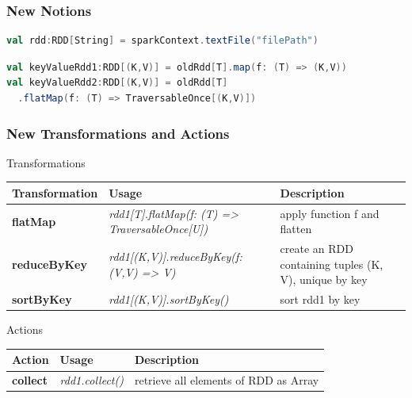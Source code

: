 \documentclass[slidetop,9pt,utf8]{beamer}
\begin{document}
\begin{frame}[fragile]
  \frametitle{New Notions}

  \begin{lstlisting}[label=LoadTextFile, caption=Load Text File, language=scala, style=code]
val rdd:RDD[String] = sparkContext.textFile("filePath")
  \end{lstlisting}

  \begin{lstlisting}[label=TransformToKeyValue, caption=Transform RDD to a Key/Value RDD (Also called PairRDD), language=scala, style=code]
val keyValueRdd1:RDD[(K,V)] = oldRdd[T].map(f: (T) => (K,V))
val keyValueRdd2:RDD[(K,V)] = oldRdd[T]
  .flatMap(f: (T) => TraversableOnce[(K,V)])
  \end{lstlisting}

\end{frame}

\begin{frame}

  \frametitle{New Transformations and Actions}

  \begin{block}{Transformations}
    \begin{center}
      \begin{tabular}{|m{2.0cm}|m{4.0cm}|m{4.9cm}|}
        \hline 
        \rowcolor{gray} \textbf{Transformation} & \textbf{Usage} & \textbf{Description} \\ \hline
        \textbf{flatMap} & \textit{rdd1[T].flatMap(f: (T) =\textgreater\xspace TraversableOnce[U])} & apply function f and flatten \\ \hline
        \textbf{reduceByKey} & \textit{rdd1[(K,V)]\newline.reduceByKey(f:(V,V) =\textgreater\xspace V)} & create an RDD containing tuples (K, V), unique by key \\ \hline
        \textbf{sortByKey} & \textit{rdd1[(K,V)].sortByKey()} & sort rdd1 by key \\ \hline
      \end{tabular}
    \end{center}
  \end{block}

  \begin{block}{Actions}
    \begin{center}
      \begin{tabular}{|m{2.0cm}|m{4.0cm}|m{4.9cm}|}
        \hline 
        \rowcolor{gray} \textbf{Action} & \textbf{Usage} & \textbf{Description} \\ \hline
        \textbf{collect} & \textit{rdd1.collect()} & retrieve all elements of RDD as Array \\ \hline
      \end{tabular}
    \end{center}
  \end{block}

\end{frame}
\end{document}
